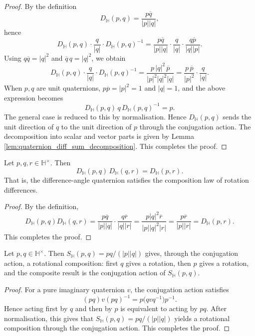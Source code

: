 \begin{proof}
By the definition
\[
D_{\mathbb H}(p,q)=\frac{p\overline q}{|p||q|},
\]
hence
\[
D_{\mathbb H}(p,q)\cdot \frac{q}{|q|}\cdot D_{\mathbb H}(p,q)^{-1}
=
\frac{p\overline q}{|p||q|}\cdot\frac{q}{|q|}\cdot\frac{q\overline p}{|q||p|}.
\]
Using $q\overline q=|q|^2$ and $\overline q\,q=|q|^2$, we obtain
\[
D_{\mathbb H}(p,q)\cdot \frac{q}{|q|}\cdot D_{\mathbb H}(p,q)^{-1}
=
\frac{p\,|q|^2\,\overline p}{|p|^2|q|^2|q|}
=
\frac{p\,\overline p}{|p|^2}\cdot\frac{q}{|q|}.
\]
When $p,q$ are unit quaternions, $p\overline p=|p|^2=1$ and $|q|=1$, and the above expression becomes
\[
D_{\mathbb H}(p,q)\,q\,D_{\mathbb H}(p,q)^{-1}=p.
\]
The general case is reduced to this by normalisation. Hence $D_{\mathbb H}(p,q)$ sends the unit direction of $q$ to the unit direction of $p$ through the conjugation action. The decomposition into scalar and vector parts is given by Lemma \ref{lem:quaternion_diff_sum_decomposition}. This completes the proof.
\end{proof}

\begin{proposition}\label{prop:quaternion_exp_similarity_composition}
Let $p,q,r\in\mathbb H^\times$. Then
\[
D_{\mathbb H}(p,q)\,D_{\mathbb H}(q,r)
=
D_{\mathbb H}(p,r).
\]
That is, the difference-angle quaternion satisfies the composition law of rotation differences.
\end{proposition}

\begin{proof}
By the definition,
\[
D_{\mathbb H}(p,q)D_{\mathbb H}(q,r)
=
\frac{p\overline q}{|p||q|}\cdot\frac{q\overline r}{|q||r|}
=
\frac{p|q|^2\overline r}{|p||q|^2|r|}
=
\frac{p\overline r}{|p||r|}
=
D_{\mathbb H}(p,r).
\]
This completes the proof.
\end{proof}

\begin{theorem}\label{thm:quaternion_sum_rotation_operator}
Let $p,q\in\mathbb H^\times$. Then $S_{\mathbb H}(p,q)=pq/(|p||q|)$ gives, through the conjugation action, a rotational composition: first $q$ gives a rotation, then $p$ gives a rotation, and the composite result is the conjugation action of $S_{\mathbb H}(p,q)$.
\end{theorem}

\begin{proof}
For a pure imaginary quaternion $v$, the conjugation action satisfies
\[
(pq)v(pq)^{-1}=p\bigl(qvq^{-1}\bigr)p^{-1}.
\]
Hence acting first by $q$ and then by $p$ is equivalent to acting by $pq$. After normalisation, this gives that $S_{\mathbb H}(p,q)=pq/(|p||q|)$ yields a rotational composition through the conjugation action. This completes the proof.
\end{proof}

